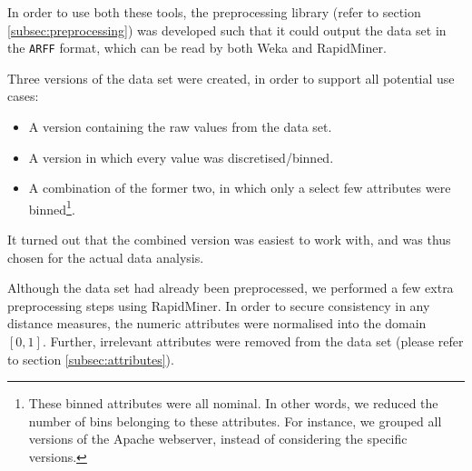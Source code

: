 In order to use both these tools, the preprocessing library (refer to section \ref{subsec:preprocessing}) was developed such that it could output the data set in the \texttt{ARFF} format, which can be read by both Weka and RapidMiner.

Three versions of the data set were created, in order to support all potential use cases:

\begin{itemize}
\item A version containing the raw values from the data set.
\item A version in which every value was discretised/binned.
\item A combination of the former two, in which only a select few attributes were binned\footnote{These binned attributes were all nominal. In other words, we reduced the number of bins belonging to these attributes. For instance, we grouped all versions of the Apache webserver, instead of considering the specific versions.}.
\end{itemize}

It turned out that the combined version was easiest to work with, and was thus chosen for the actual data analysis.

Although the data set had already been preprocessed, we performed a few extra preprocessing steps using RapidMiner. In order to secure consistency in any distance measures, the numeric attributes were normalised into the domain $[0, 1]$. Further, irrelevant attributes were removed from the data set (please refer to section \ref{subsec:attributes}).